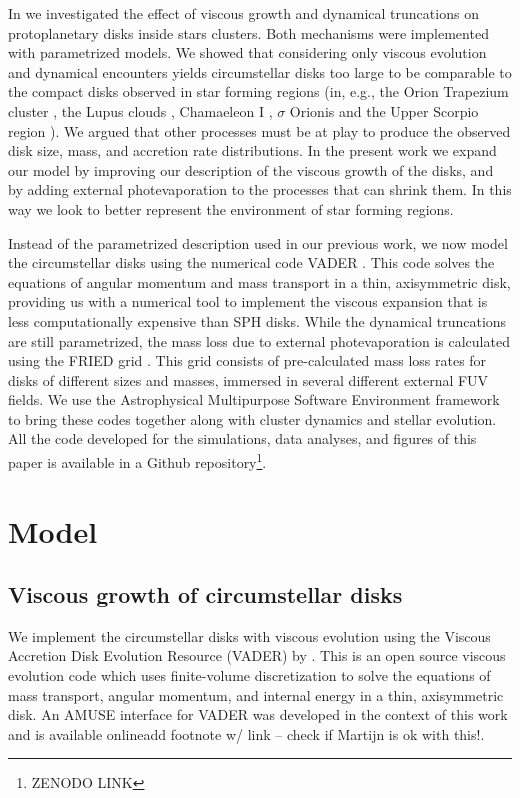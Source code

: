\documentclass[fleqn,usenatbib]{mnras}
\newcommand\note[1]{{\colorbox{yellow!60}{\color{magenta}#1}}}
\begin{document}
In \citet{concha-ramirez2019} we investigated the effect of viscous growth and dynamical truncations on protoplanetary disks inside stars clusters. Both mechanisms were implemented with parametrized models. We showed that considering only viscous evolution and dynamical encounters yields circumstellar disks too large to be comparable to the compact disks observed in star forming regions (in, e.g., the Orion Trapezium cluster \citep{vicente2005,mann2009,robberto2004}, the Lupus clouds \citep{ansdell2018,tazzari2017,alcala2014}, Chamaeleon I \citep{pascucci2016,mulders2017,manara2017}, $\sigma$ Orionis \citep{mauco2016,ansdell2017} and the Upper Scorpio region \citep{barenfeld2017,barenfeld2016}). We argued that other processes must be at play to produce the observed disk size, mass, and accretion rate distributions. In the present work we expand our model by improving our description of the viscous growth of the disks, and by adding external photevaporation to the processes that can shrink them. In this way we look to better represent the environment of star forming regions. 

Instead of the parametrized description used in our previous work, we now model the circumstellar disks using the numerical code VADER \citep{krumholz2015}. This code solves the equations of angular momentum and mass transport in a thin, axisymmetric disk, providing us with a numerical tool to implement the viscous expansion that is less computationally expensive than SPH disks. While the dynamical truncations are still parametrized, the mass loss due to external photevaporation is calculated using the FRIED grid \citep{haworth2018}. This grid consists of pre-calculated mass loss rates for disks of different sizes and masses, immersed in several different external FUV fields. We use the Astrophysical Multipurpose Software Environment \citep[AMUSE\footnote{\url{http://amusecode.org}},][]{portegieszwart2019} framework to bring these codes together along with cluster dynamics and stellar evolution. All the code developed for the simulations, data analyses, and figures of this paper is available in a Github repository\footnote{ZENODO LINK}.


\section{Model}
\label{sec:model}

\subsection{Viscous growth of circumstellar disks}\label{viscous}
We implement the circumstellar disks with viscous evolution using the Viscous Accretion Disk Evolution Resource (VADER) by \citet{krumholz2015}. This is an open source viscous evolution code which uses finite-volume discretization to solve the equations of mass transport, angular momentum, and internal energy in a thin, axisymmetric disk. An AMUSE interface for VADER was developed in the context of this work and is available online\note{add footnote w/ link -- check if Martijn is ok with this!}.  
\end{document}
